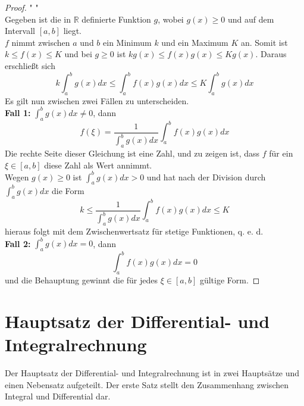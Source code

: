 \documentclass[fontsize=12pt,paper=a4,DIV12,cleardoublepage=empty, 
liststotoc,idxtotoc,bibtotoc]{article}
\newcommand{\RR}{\mathbb{R}}
\theoremstyle{plain}
\theoremstyle{definition}
\begin{document}
	\begin{proof}" "\\
		Gegeben ist die in $\RR$ definierte Funktion $g$, wobei $g(x)\geq0$ und auf dem Intervall $[a, b]$ liegt.\\
		$f$ nimmt zwischen $a$ und $b$ ein Minimum $k$ und ein Maximum $K$ an. Somit ist $k \leq f(x) \leq K$ und bei $g\geq0$ ist $kg(x)\leq f(x)g(x)\leq Kg(x)$. Daraus erschließt sich
		\begin{equation*}
			k \int_{a}^{b}g(x)dx \leq \int_{a}^{b}f(x)g(x)dx\leq K\int_{a}^{b}g(x)dx
		\end{equation*}
		Es gilt nun zwischen zwei Fällen zu unterscheiden.\\
		\textbf{Fall 1:} $\int_{a}^{b}g(x)dx \neq 0$, dann
		\begin{equation*}
			f(\xi)=\frac{1}{\int_{a}^{b}g(x)dx}\int_{a}^{b}f(x)g(x)dx
		\end{equation*}
		Die rechte Seite dieser Gleichung ist eine Zahl, und zu zeigen ist, dass $f$ für ein $\xi \in [a, b]$ diese Zahl als Wert annimmt.\\	
		Wegen $g(x) \geq 0$ ist $\int_{a}^{b}g(x)dx > 0$ und hat nach der Division durch $\int_{a}^{b}g(x)dx$ die Form
		\begin{equation*}
			k \leq \frac{1}{\int_{a}^{b}g(x)dx}\int_{a}^{b}f(x)g(x)dx \leq K
		\end{equation*}
		hieraus folgt mit dem Zwischenwertsatz für stetige Funktionen, q. e. d.\\
		\textbf{Fall 2:} $\int_{a}^{b}g(x)dx = 0$, dann 
		\begin{equation*}
			 \int_{a}^{b}f(x)g(x)dx = 0
		\end{equation*}
		und die Behauptung gewinnt die für jedes $\xi \in [a, b]$ gültige Form.
	\end{proof}
	\newpage
	
	
	\section{Hauptsatz der Differential- und Integralrechnung}
	
	Der Hauptsatz der Differential- und Integralrechnung ist in zwei Hauptsätze und einen Nebensatz aufgeteilt. Der erste Satz stellt den Zusammenhang zwischen Integral und Differential dar.
\end{document}
